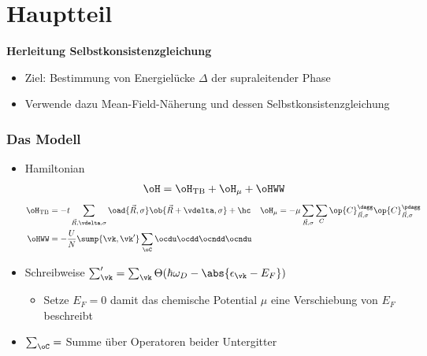 \section{ Hauptteil }

\begin{frame}[plain]
    \centering
    \Large
    \textbf{Herleitung Selbstkonsistenzgleichung}
    \vspace{1cm}
    \begin{itemize}
        \item Ziel: Bestimmung von Energielücke $\Delta$ der supraleitender Phase
        \item Verwende dazu Mean-Field-Näherung und dessen Selbstkonsistenzgleichung
    \end{itemize}
\end{frame}


\begin{frame}
    \frametitle{Das Modell}
    \begin{itemize}
        \item Hamiltonian
        \begin{align*}
            \oH = \oH_{\text{TB}} + \oH_{\mu} + \oHWW
        \end{align*}
        \begin{align*}
            \oH_{\text{TB}} &= -t \sum_{\vec{R}, \vdelta, \sigma} \oad{\vec{R}, \sigma} \ob{\vec{R}+\vdelta, \sigma} + \hc &
            \oH_\mu &= - \mu \sum_{\vec{R}, \sigma} \sum_C \op{C}^{\dagg}_{\vec{R}, \sigma} \op{C}^{\pdagg}_{\vec{R}, \sigma} \\
            \oHWW &=  - \frac{U}{N} \sump{\vk, \vk'} \sum_\oC  \ocdu \ocdd \ocndd \ocndu 
        \end{align*}
        \item Schreibweise $\sum_{\vk}' = \sum_{\vk} \Theta(\hbar \omega_D - \abs{\epsilon_\vk - E_F})$
        \begin{itemize}
            \item[$\rightarrow$] Setze $E_F = 0$ damit das chemische Potential $\mu$ eine Verschiebung von $E_F$ beschreibt
        \end{itemize}
        \item $\sum_\oC  = $ Summe über Operatoren beider Untergitter
    \end{itemize}
\end{frame}

